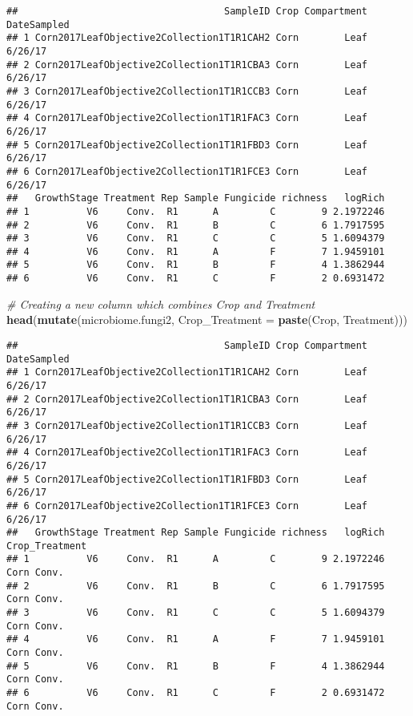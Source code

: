 \documentclass[
]{article}
\newenvironment{Shaded}{\begin{snugshade}}{\end{snugshade}}
\newcommand{\AttributeTok}[1]{\textcolor[rgb]{0.13,0.29,0.53}{#1}}
\newcommand{\CommentTok}[1]{\textcolor[rgb]{0.56,0.35,0.01}{\textit{#1}}}
\newcommand{\FunctionTok}[1]{\textcolor[rgb]{0.13,0.29,0.53}{\textbf{#1}}}
\newcommand{\NormalTok}[1]{#1}
\begin{document}
\begin{verbatim}
##                                    SampleID Crop Compartment DateSampled
## 1 Corn2017LeafObjective2Collection1T1R1CAH2 Corn        Leaf     6/26/17
## 2 Corn2017LeafObjective2Collection1T1R1CBA3 Corn        Leaf     6/26/17
## 3 Corn2017LeafObjective2Collection1T1R1CCB3 Corn        Leaf     6/26/17
## 4 Corn2017LeafObjective2Collection1T1R1FAC3 Corn        Leaf     6/26/17
## 5 Corn2017LeafObjective2Collection1T1R1FBD3 Corn        Leaf     6/26/17
## 6 Corn2017LeafObjective2Collection1T1R1FCE3 Corn        Leaf     6/26/17
##   GrowthStage Treatment Rep Sample Fungicide richness   logRich
## 1          V6     Conv.  R1      A         C        9 2.1972246
## 2          V6     Conv.  R1      B         C        6 1.7917595
## 3          V6     Conv.  R1      C         C        5 1.6094379
## 4          V6     Conv.  R1      A         F        7 1.9459101
## 5          V6     Conv.  R1      B         F        4 1.3862944
## 6          V6     Conv.  R1      C         F        2 0.6931472
\end{verbatim}

\begin{Shaded}
\begin{Highlighting}[]
\CommentTok{\# Creating a new column which combines Crop and Treatment}
\FunctionTok{head}\NormalTok{(}\FunctionTok{mutate}\NormalTok{(microbiome.fungi2, }\AttributeTok{Crop\_Treatment =} \FunctionTok{paste}\NormalTok{(Crop, Treatment)))}
\end{Highlighting}
\end{Shaded}

\begin{verbatim}
##                                    SampleID Crop Compartment DateSampled
## 1 Corn2017LeafObjective2Collection1T1R1CAH2 Corn        Leaf     6/26/17
## 2 Corn2017LeafObjective2Collection1T1R1CBA3 Corn        Leaf     6/26/17
## 3 Corn2017LeafObjective2Collection1T1R1CCB3 Corn        Leaf     6/26/17
## 4 Corn2017LeafObjective2Collection1T1R1FAC3 Corn        Leaf     6/26/17
## 5 Corn2017LeafObjective2Collection1T1R1FBD3 Corn        Leaf     6/26/17
## 6 Corn2017LeafObjective2Collection1T1R1FCE3 Corn        Leaf     6/26/17
##   GrowthStage Treatment Rep Sample Fungicide richness   logRich Crop_Treatment
## 1          V6     Conv.  R1      A         C        9 2.1972246     Corn Conv.
## 2          V6     Conv.  R1      B         C        6 1.7917595     Corn Conv.
## 3          V6     Conv.  R1      C         C        5 1.6094379     Corn Conv.
## 4          V6     Conv.  R1      A         F        7 1.9459101     Corn Conv.
## 5          V6     Conv.  R1      B         F        4 1.3862944     Corn Conv.
## 6          V6     Conv.  R1      C         F        2 0.6931472     Corn Conv.
\end{verbatim}
\end{document}
